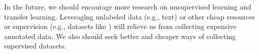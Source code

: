 In the future, we should encourage more research on unsupervised learning and transfer learning. Leveraging unlabeled data (e.g., text) or other cheap resources or supervision (e.g., datasets like ) will relieve us from collecting expensive annotated data. We also should seek better and cheaper ways of collecting supervised datasets.
%
